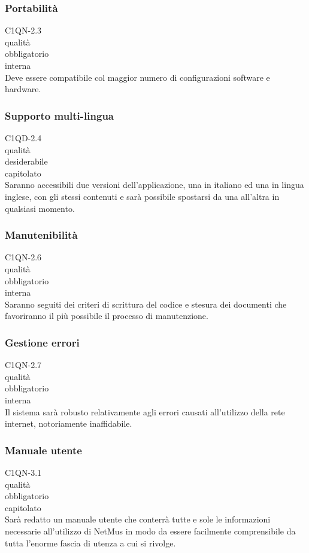 \subsubsection*{Portabilit\`a}
 C1QN-2.3 \\
 qualit\`a \\
 obbligatorio \\
 interna \\
Deve essere compatibile col maggior numero di configurazioni software e
hardware.

\subsubsection*{Supporto multi-lingua}
 C1QD-2.4 \\
 qualit\`a \\
 desiderabile \\
 capitolato \\
Saranno accessibili due versioni dell'applicazione, una in italiano ed una in
lingua inglese, con gli stessi contenuti e sar\`a possibile spostarsi da una
all'altra in qualsiasi momento.

\subsubsection*{Manutenibilit\`a}
 C1QN-2.6 \\
 qualit\`a \\
 obbligatorio \\
 interna \\
Saranno seguiti dei criteri di scrittura del codice e stesura dei documenti che
favoriranno il pi\`u possibile il processo di manutenzione.

\subsubsection*{Gestione errori}
 C1QN-2.7 \\
 qualit\`a \\
 obbligatorio \\
 interna \\
Il sistema sar\`a robusto relativamente agli errori causati all'utilizzo della
rete internet, notoriamente inaffidabile.

\subsubsection*{Manuale utente}
 C1QN-3.1 \\
 qualit\`a \\
 obbligatorio \\
 capitolato \\
Sar\`a redatto un manuale utente che conterr\`a tutte e sole le informazioni
necessarie all'utilizzo di NetMus in modo da essere facilmente comprensibile da
tutta l'enorme fascia di utenza a cui si rivolge.

